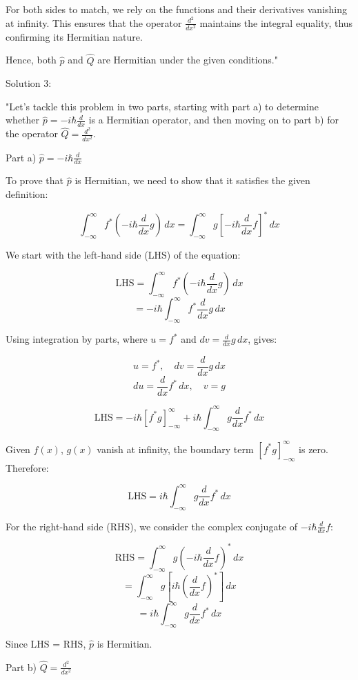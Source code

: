 For both sides to match, we rely on the functions and their derivatives vanishing at infinity. This ensures that the operator \( \frac{d^{2}}{dx^{2}} \) maintains the integral equality, thus confirming its Hermitian nature.

Hence, both \( \hat{p} \) and \( \hat{Q} \) are Hermitian under the given conditions."

Solution 3:

"Let's tackle this problem in two parts, starting with part a) to determine whether \( \hat{p} = -i\hbar\frac{d}{dx} \) is a Hermitian operator, and then moving on to part b) for the operator \( \hat{Q} = \frac{d^{2}}{dx^{2}} \).

Part a) \( \hat{p} = -i\hbar\frac{d}{dx} \)

To prove that \( \hat{p} \) is Hermitian, we need to show that it satisfies the given definition:

\[ \int_{-\infty}^{\infty} f^{*}(-i\hbar\frac{d}{dx}g) \, dx = \int_{-\infty}^{\infty} g[-i\hbar\frac{d}{dx}f]^{*} \, dx \]

We start with the left-hand side (LHS) of the equation:

\[ \text{LHS} = \int_{-\infty}^{\infty} f^{*}(-i\hbar\frac{d}{dx}g) \, dx \]
\[ = -i\hbar\int_{-\infty}^{\infty} f^{*}\frac{d}{dx}g \, dx \]

Using integration by parts, where \( u = f^{*} \) and \( dv = \frac{d}{dx}g \, dx \), gives:

\[ u = f^{*}, \quad dv = \frac{d}{dx}g \, dx \]
\[ du = \frac{d}{dx}f^{*} \, dx, \quad v = g \]

\[ \text{LHS} = -i\hbar[f^{*}g]_{-\infty}^{\infty} + i\hbar\int_{-\infty}^{\infty} g\frac{d}{dx}f^{*} \, dx \]

Given \( f(x) \), \( g(x) \) vanish at infinity, the boundary term \( [f^{*}g]_{-\infty}^{\infty} \) is zero. Therefore:

\[ \text{LHS} = i\hbar\int_{-\infty}^{\infty} g\frac{d}{dx}f^{*} \, dx \]

For the right-hand side (RHS), we consider the complex conjugate of \( -i\hbar\frac{d}{dx}f \):

\[ \text{RHS} = \int_{-\infty}^{\infty} g(-i\hbar\frac{d}{dx}f)^{*} \, dx \]
\[ = \int_{-\infty}^{\infty} g[i\hbar(\frac{d}{dx}f)^{*}] \, dx \]
\[ = i\hbar\int_{-\infty}^{\infty} g\frac{d}{dx}f^{*} \, dx \]

Since LHS = RHS, \( \hat{p} \) is Hermitian.

Part b) \( \hat{Q} = \frac{d^{2}}{dx^{2}} \)


